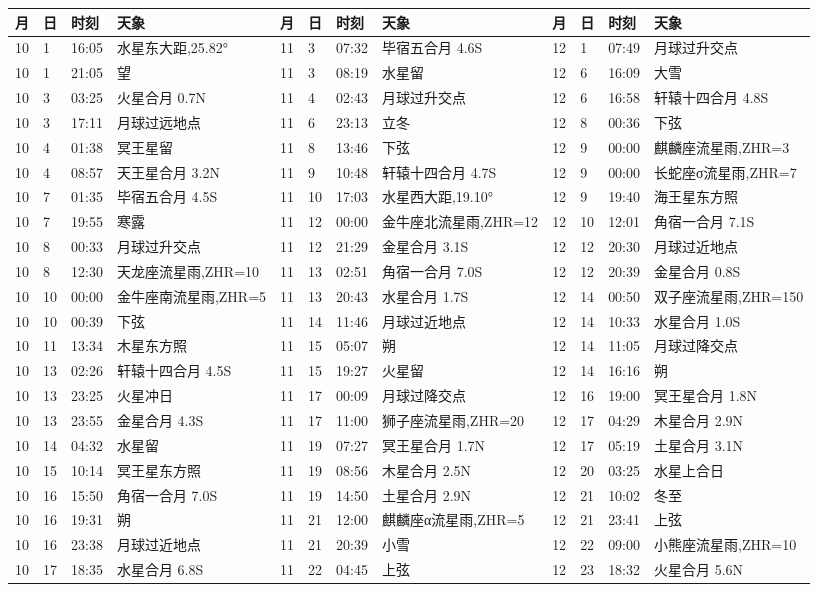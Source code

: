 \begin{tabular}{llll|llll|llll}
\hline
	月 & 日 & 时刻 & 天象 &         %
	月 & 日 & 时刻 & 天象 &
	月 & 日 & 时刻 & 天象 \tabularnewline
\hline
10 & 1 & 16:05 & 水星东大距,25.82° & 11 & 3 & 07:32 & 毕宿五合月 4.6S & 12 & 1 & 07:49 & 月球过升交点 \tabularnewline
10 & 1 & 21:05 & 望 & 11 & 3 & 08:19 & 水星留 & 12 & 6 & 16:09 & 大雪 \tabularnewline
10 & 3 & 03:25 & 火星合月 0.7N & 11 & 4 & 02:43 & 月球过升交点 & 12 & 6 & 16:58 & 轩辕十四合月 4.8S \tabularnewline
10 & 3 & 17:11 & 月球过远地点 & 11 & 6 & 23:13 & 立冬 & 12 & 8 & 00:36 & 下弦 \tabularnewline
10 & 4 & 01:38 & 冥王星留 & 11 & 8 & 13:46 & 下弦 & 12 & 9 & 00:00 & 麒麟座流星雨,ZHR=3 \tabularnewline
10 & 4 & 08:57 & 天王星合月 3.2N & 11 & 9 & 10:48 & 轩辕十四合月 4.7S & 12 & 9 & 00:00 & 长蛇座σ流星雨,ZHR=7 \tabularnewline
10 & 7 & 01:35 & 毕宿五合月 4.5S & 11 & 10 & 17:03 & 水星西大距,19.10° & 12 & 9 & 19:40 & 海王星东方照 \tabularnewline
10 & 7 & 19:55 & 寒露 & 11 & 12 & 00:00 & 金牛座北流星雨,ZHR=12 & 12 & 10 & 12:01 & 角宿一合月 7.1S \tabularnewline
10 & 8 & 00:33 & 月球过升交点 & 11 & 12 & 21:29 & 金星合月 3.1S & 12 & 12 & 20:30 & 月球过近地点 \tabularnewline
10 & 8 & 12:30 & 天龙座流星雨,ZHR=10 & 11 & 13 & 02:51 & 角宿一合月 7.0S & 12 & 12 & 20:39 & 金星合月 0.8S \tabularnewline
10 & 10 & 00:00 & 金牛座南流星雨,ZHR=5 & 11 & 13 & 20:43 & 水星合月 1.7S & 12 & 14 & 00:50 & 双子座流星雨,ZHR=150 \tabularnewline
10 & 10 & 00:39 & 下弦 & 11 & 14 & 11:46 & 月球过近地点 & 12 & 14 & 10:33 & 水星合月 1.0S \tabularnewline
10 & 11 & 13:34 & 木星东方照 & 11 & 15 & 05:07 & 朔 & 12 & 14 & 11:05 & 月球过降交点 \tabularnewline
10 & 13 & 02:26 & 轩辕十四合月 4.5S & 11 & 15 & 19:27 & 火星留 & 12 & 14 & 16:16 & 朔 \tabularnewline
10 & 13 & 23:25 & 火星冲日 & 11 & 17 & 00:09 & 月球过降交点 & 12 & 16 & 19:00 & 冥王星合月 1.8N \tabularnewline
10 & 13 & 23:55 & 金星合月 4.3S & 11 & 17 & 11:00 & 狮子座流星雨,ZHR=20 & 12 & 17 & 04:29 & 木星合月 2.9N \tabularnewline
10 & 14 & 04:32 & 水星留 & 11 & 19 & 07:27 & 冥王星合月 1.7N & 12 & 17 & 05:19 & 土星合月 3.1N \tabularnewline
10 & 15 & 10:14 & 冥王星东方照 & 11 & 19 & 08:56 & 木星合月 2.5N & 12 & 20 & 03:25 & 水星上合日 \tabularnewline
10 & 16 & 15:50 & 角宿一合月 7.0S & 11 & 19 & 14:50 & 土星合月 2.9N & 12 & 21 & 10:02 & 冬至 \tabularnewline
10 & 16 & 19:31 & 朔 & 11 & 21 & 12:00 & 麒麟座α流星雨,ZHR=5 & 12 & 21 & 23:41 & 上弦 \tabularnewline
10 & 16 & 23:38 & 月球过近地点 & 11 & 21 & 20:39 & 小雪 & 12 & 22 & 09:00 & 小熊座流星雨,ZHR=10 \tabularnewline
10 & 17 & 18:35 & 水星合月 6.8S & 11 & 22 & 04:45 & 上弦 & 12 & 23 & 18:32 & 火星合月 5.6N \tabularnewline

\end{tabular}
